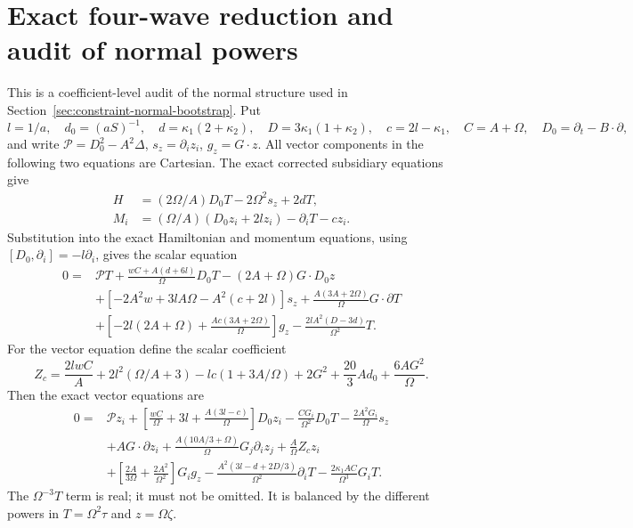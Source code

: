\section{Exact four-wave reduction and audit of normal powers}
\label{sec:constraint-wave-reduction}

This is a coefficient-level audit of the normal structure used in
Section~\ref{sec:constraint-normal-bootstrap}. Put
\[
 l=1/a,\quad d_0=(aS)^{-1},\quad
 d=\kappa_1(2+\kappa_2),\quad D=3\kappa_1(1+\kappa_2),
 \quad c=2l-\kappa_1,\quad C=A+\Omega,
 \quad D_0=\partial_t-B\cdot\partial,
\]
and write $\mathcal P=D_0^2-A^2\Delta$,
$s_z=\partial_i z_i$, $g_z=G\cdot z$. All vector components in the following
two equations are Cartesian. The exact corrected subsidiary equations give
\begin{align}
H&=(2\Omega/A)D_0T-2\Omega^2s_z+2dT,\\
M_i&=(\Omega/A)(D_0z_i+2lz_i)-\partial_iT-cz_i.
\end{align}
Substitution into the exact Hamiltonian and momentum equations, using
$[D_0,\partial_i]=-l\partial_i$, gives the scalar equation
\begin{align}
0={}&\mathcal P T+
 \frac{wC+A(d+6l)}\Omega D_0T
 -(2A+\Omega)G\cdot D_0z\\
&+[-2A^2w+3lA\Omega-A^2(c+2l)]s_z
 +\frac{A(3A+2\Omega)}\Omega G\cdot\partial T\\
&+\left[-2l(2A+\Omega)+\frac{Ac(3A+2\Omega)}\Omega\right]g_z
 -\frac{2lA^2(D-3d)}{\Omega^2}T .
\label{eq:constraint-scalar-wave-exact}
\end{align}
For the vector equation define the scalar coefficient
\[
 Z_c=\frac{2lwC}{A}+2l^2(\Omega/A+3)
 -lc(1+3A/\Omega)+2G^2+\frac{20}{3}Ad_0+
 \frac{6AG^2}\Omega.
\]
Then the exact vector equations are
\begin{align}
0={}&\mathcal P z_i+
 \left[\frac{wC}\Omega+3l+\frac{A(3l-c)}\Omega\right]D_0z_i
 -\frac{CG_i}{\Omega^2}D_0T-\frac{2A^2G_i}\Omega s_z\\
&+A G\cdot\partial z_i+
 \frac{A(10A/3+\Omega)}\Omega G_j\partial_i z_j
 +\frac A\Omega Z_c z_i\\
&+\left[\frac{2A}{3\Omega}+\frac{2A^2}{\Omega^2}\right]G_i g_z
 -\frac{A^2(3l-d+2D/3)}{\Omega^2}\partial_iT
 -\frac{2\kappa_1AC}{\Omega^3}G_iT .
\label{eq:constraint-vector-wave-exact}
\end{align}
The $\Omega^{-3}T$ term is real; it must not be omitted. It is balanced by
the different powers in $T=\Omega^2\tau$ and $z=\Omega\zeta$.

